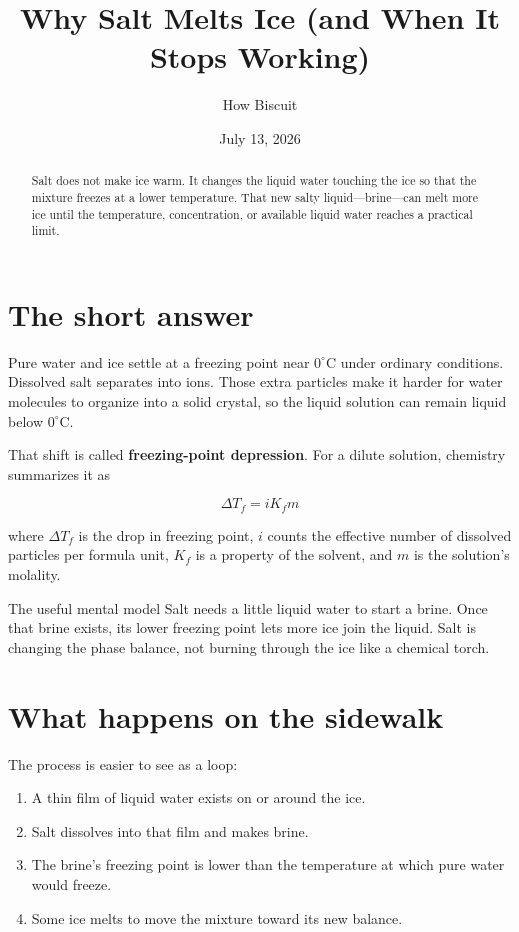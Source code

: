 \documentclass[11pt]{article}
\title{Why Salt Melts Ice (and When It Stops Working)}
\author{How Biscuit}
\date{July 13, 2026}
\begin{document}
\maketitle

\begin{abstract}
Salt does not make ice warm. It changes the liquid water touching the ice so that the mixture freezes at a lower temperature. That new salty liquid---brine---can melt more ice until the temperature, concentration, or available liquid water reaches a practical limit.
\end{abstract}

\section{The short answer}

Pure water and ice settle at a freezing point near \(0^\circ\mathrm{C}\) under ordinary conditions. Dissolved salt separates into ions. Those extra particles make it harder for water molecules to organize into a solid crystal, so the liquid solution can remain liquid below \(0^\circ\mathrm{C}\).

That shift is called \textbf{freezing-point depression}. For a dilute solution, chemistry summarizes it as

\begin{equation}
\Delta T_f = i K_f m
\end{equation}

where \(\Delta T_f\) is the drop in freezing point, \(i\) counts the effective number of dissolved particles per formula unit, \(K_f\) is a property of the solvent, and \(m\) is the solution's molality.

\begin{biscuitbox}{The useful mental model}
Salt needs a little liquid water to start a brine. Once that brine exists, its lower freezing point lets more ice join the liquid. Salt is changing the phase balance, not burning through the ice like a chemical torch.
\end{biscuitbox}

\section{What happens on the sidewalk}

The process is easier to see as a loop:

\begin{enumerate}
\item A thin film of liquid water exists on or around the ice.
\item Salt dissolves into that film and makes brine.
\item The brine's freezing point is lower than the temperature at which pure water would freeze.
\item Some ice melts to move the mixture toward its new balance.
\end{enumerate}
\end{document}
